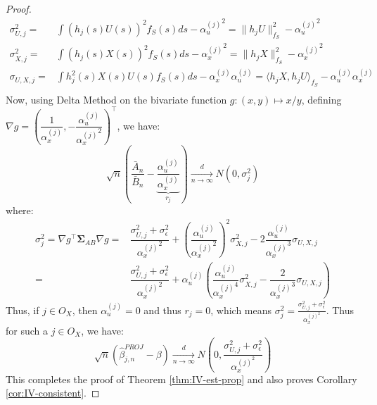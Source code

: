 \documentclass[
  12pt]{article}
\newcommand{\dnlim}{\xrightarrow[n \to \infty]{d}}
\newcommand{\bSig}{\boldsymbol{\Sigma}}
\begin{document}
\begin{proof}
$$\begin{aligned}
    \sigma^2_{U,j} = & \int (h_j(s)U(s))^2f_S(s)ds   - {\alpha_u^{(j)}}^2 = \|h_j U\|^2_{f_S} - {\alpha_u^{(j)}}^2\\
    \sigma^2_{X,j} = & \int (h_j(s)X(s))^2f_S(s)ds   - {\alpha_x^{(j)}}^2 = \|h_j X\|^2_{f_S} - {\alpha_x^{(j)}}^2\\
        \sigma_{U,X,j} = & \int h^2_j(s)X(s)U(s)f_S(s)ds  - \alpha_x^{(j)}\alpha_u^{(j)} = \langle h_jX, h_jU\rangle_{f_S} - {\alpha_u^{(j)}}{\alpha_x^{(j)}}\\
\end{aligned}
$$
Now, using Delta Method on the bivariate function $g: (x,y) \mapsto x/y$, defining $\nabla g = \left(\dfrac{1}{\alpha_x^{(j)}}, -\dfrac{\alpha_u^{(j)}}{{\alpha_x^{(j)}}^2}\right)^\top$, we have:
\begin{equation}\label{eq:clt-ratio}
    \sqrt{n}\left(\dfrac{\bar{A}_n}{\bar{B}_n} - \underbrace{\dfrac{\alpha_u^{(j)}}{\alpha_x^{(j)}}}_{r_j}\right) \dnlim N\left(0, \sigma^2_{j}\right)
\end{equation}
where:
$$
\begin{aligned}
\sigma^2_{j} = \nabla g^\top\bSig_{AB}\nabla g = &\dfrac{\sigma^2_{U,j}+ \sigma^2_\epsilon}{{\alpha_x^{(j)}}^2} + \left(\dfrac{\alpha_u^{(j)}}{{\alpha_x^{(j)}}^2}\right)^2\sigma^2_{X,j} - 2\dfrac{\alpha_u^{(j)}}{{\alpha_x^{(j)}}^3}\sigma_{U,X,j}\\
= & \dfrac{\sigma^2_{U,j} + \sigma^2_\epsilon}{{\alpha_x^{(j)}}^2} + \alpha_u^{(j)}\left(\dfrac{\alpha_u^{(j)}}{{\alpha_x^{(j)}}^4}\sigma^2_{X,j} - \dfrac{2}{{\alpha_x^{(j)}}^3}\sigma_{U,X,j}\right)
\end{aligned}
$$
Thus, if $j \in O_X$, then $\alpha_u^{(j)} = 0$ and thus $r_j = 0$, which means $\sigma_{j}^2 = \frac{\sigma^2_{U,j} + \sigma^2_\epsilon}{\alpha_x^{(j)^2}} $. Thus for such a $j\in O_X$, we have:
$$
\sqrt{n}\left(\hat{\beta}^{PROJ}_{j,n} - \beta\right) \dnlim N\left(0, \dfrac{\sigma^2_{U,j} + \sigma^2_\epsilon}{\alpha_x^{(j)^2}}\right)
$$
This completes the proof of Theorem \ref{thm:IV-est-prop} and also proves Corollary \ref{cor:IV-consistent}.
\end{proof}
\end{document}
